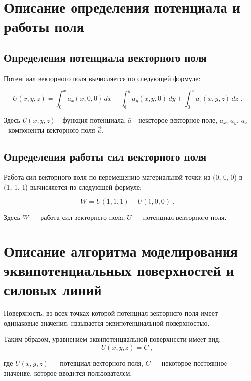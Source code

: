 \documentclass[14pt,a4paper,final]{extreport}
\begin{document}
\section{Описание определения потенциала и работы поля}

\subsection{Определения потенциала векторного поля}

Потенциал векторного поля вычисляется по следующей формуле:

\[ U(x, y, z) = \int_0^x a_x(x, 0, 0)\,dx + \int_0^y a_y(x, y, 0)\,dy + \int_0^z a_z(x, y, z)\,dz \;. \]

\pagebreak %



Здесь $U(x, y, z)$ - функция потенциала, $\bar{a}$ - некоторое векторное поле, $a_{x}$, $a_{y}$, $a_{z}$ - компоненты векторного поля $\vec{a}$.

\subsection{Определения работы сил векторного поля}

Работа сил векторного поля по перемещению материальной точки из (0, 0, 0) в (1, 1, 1) вычисляется по следующей формуле:

\[ W = U(1,1,1) - U(0,0,0) \;. \]

Здесь $W$ --- работа сил векторного поля, $U$ --- потенциал векторного поля.


\section{Описание алгоритма моделирования эквипотенциальных поверхностей и силовых линий}

Поверхность, во всех точках которой потенциал векторного поля имеет одинаковые значения, называется эквипотенциальной поверхностью.

Таким образом, уравнением эквипотенциальной поверхности имеет вид:
$$U(x, y, z) = C \;,$$



где $U(x, y, z)$ --- потенциал векторного поля, $C$ --- некоторое постоянное значение, которое вводится пользователем.
\end{document}
